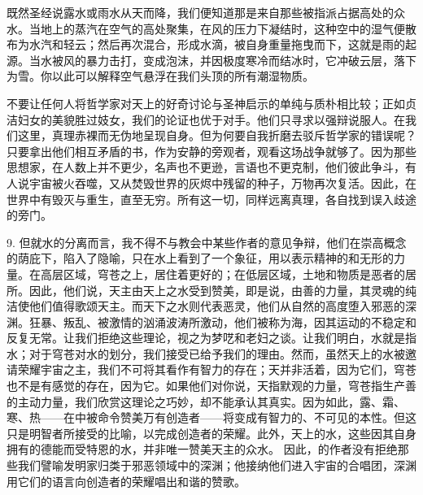 既然圣经说露水或雨水从天而降，我们便知道那是来自那些被指派占据高处的众水。当地上的蒸汽在空气的高处聚集，在风的压力下凝结时，这种空中的湿气便散布为水汽和轻云；然后再次混合，形成水滴，被自身重量拖曳而下，这就是雨的起源。当水被风的暴力击打，变成泡沫，并因极度寒冷而结冰时，它冲破云层，落下为雪。你以此可以解释空气悬浮在我们头顶的所有潮湿物质。\par

不要让任何人将哲学家对天上的好奇讨论与圣神启示的单纯与质朴相比较；正如贞洁妇女的美貌胜过妓女，我们的论证也优于对手。他们只寻求以强辩说服人。在我们这里，真理赤裸而无伪地呈现自身。但为何要自我折磨去驳斥哲学家的错误呢？只要拿出他们相互矛盾的书，作为安静的旁观者，观看这场战争就够了。因为那些思想家，在人数上并不更少，名声也不更逊，言语也不更克制，他们彼此争斗，有人说宇宙被火吞噬，又从焚毁世界的灰烬中残留的种子，万物再次复活。因此，在世界中有毁灭与重生，直至无穷。所有这一切，同样远离真理，各自找到误入歧途的旁门。\par

9. 但就水的分离而言，我不得不与教会中某些作者的意见争辩，他们在崇高概念的荫庇下，陷入了隐喻，只在水上看到了一个象征，用以表示精神的和无形的力量。在高层区域，穹苍之上，居住着更好的；在低层区域，土地和物质是恶者的居所。因此，他们说，天主由天上之水受到赞美，即是说，由善的力量，其灵魂的纯洁使他们值得歌颂天主。而天下之水则代表恶灵，他们从自然的高度堕入邪恶的深渊。狂暴、叛乱、被激情的汹涌波涛所激动，他们被称为海，因其运动的不稳定和反复无常。让我们拒绝这些理论，视之为梦呓和老妇之谈。让我们明白，水就是指水；对于穹苍对水的划分，我们接受已给予我们的理由。然而，虽然天上的水被邀请荣耀宇宙之主，我们不可将其看作有智力的存在；天并非活着，因为它们，穹苍也不是有感觉的存在，因为它。如果他们对你说，天指默观的力量，穹苍指生产善的主动力量，我们欣赏这理论之巧妙，却不能承认其真实。因为如此，露、霜、寒、热——在中被命令赞美万有创造者——将变成有智力的、不可见的本性。但这只是明智者所接受的比喻，以完成创造者的荣耀。此外，天上的水，这些因其自身拥有的德能而受特恩的水，并非唯一赞美天主的众水。 因此，的作者没有拒绝那些我们譬喻发明家归类于邪恶领域中的深渊；他接纳他们进入宇宙的合唱团，深渊用它们的语言向创造者的荣耀唱出和谐的赞歌。\par

